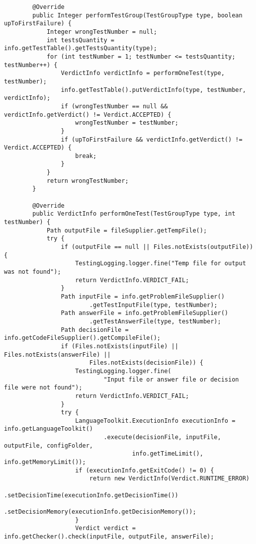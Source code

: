 \begin{verbatim}
        @Override
        public Integer performTestGroup(TestGroupType type, boolean upToFirstFailure) {
            Integer wrongTestNumber = null;
            int testsQuantity = info.getTestTable().getTestsQuantity(type);
            for (int testNumber = 1; testNumber <= testsQuantity; testNumber++) {
                VerdictInfo verdictInfo = performOneTest(type, testNumber);
                info.getTestTable().putVerdictInfo(type, testNumber, verdictInfo);
                if (wrongTestNumber == null && verdictInfo.getVerdict() != Verdict.ACCEPTED) {
                    wrongTestNumber = testNumber;
                }
                if (upToFirstFailure && verdictInfo.getVerdict() != Verdict.ACCEPTED) {
                    break;
                }
            }
            return wrongTestNumber;
        }

        @Override
        public VerdictInfo performOneTest(TestGroupType type, int testNumber) {
            Path outputFile = fileSupplier.getTempFile();
            try {
                if (outputFile == null || Files.notExists(outputFile)) {
                    TestingLogging.logger.fine("Temp file for output was not found");
                    return VerdictInfo.VERDICT_FAIL;
                }
                Path inputFile = info.getProblemFileSupplier()
                        .getTestInputFile(type, testNumber);
                Path answerFile = info.getProblemFileSupplier()
                        .getTestAnswerFile(type, testNumber);
                Path decisionFile = info.getCodeFileSupplier().getCompileFile();
                if (Files.notExists(inputFile) || Files.notExists(answerFile) ||
                        Files.notExists(decisionFile)) {
                    TestingLogging.logger.fine(
                            "Input file or answer file or decision file were not found");
                    return VerdictInfo.VERDICT_FAIL;
                }
                try {
                    LanguageToolkit.ExecutionInfo executionInfo = info.getLanguageToolkit()
                            .execute(decisionFile, inputFile, outputFile, configFolder,
                                    info.getTimeLimit(), info.getMemoryLimit());
                    if (executionInfo.getExitCode() != 0) {
                        return new VerdictInfo(Verdict.RUNTIME_ERROR)
                                .setDecisionTime(executionInfo.getDecisionTime())
                                .setDecisionMemory(executionInfo.getDecisionMemory());
                    }
                    Verdict verdict = info.getChecker().check(inputFile, outputFile, answerFile);

\end{verbatim}
